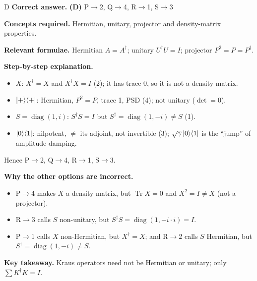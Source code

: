 \documentclass[11pt,a4paper]{article}
\newcommand{\qsep}{\par\vspace{2pt}{\color{black!15}\hrule}\vspace{4pt}}
\begin{document}
\begin{solbox}{D}
\textbf{\color{brand}Correct answer.} \textcolor{okgreen}{\textbf{(D)}} P$\to$2, Q$\to$4, R$\to$1, S$\to$3

\textbf{\color{brand}Concepts required.} Hermitian, unitary, projector and density-matrix properties.

\textbf{\color{brand}Relevant formulae.} Hermitian $A = A^\dagger$; unitary $U^\dagger U = I$; projector $P^2 = P = P^\dagger$.

\textbf{\color{brand}Step-by-step explanation.} \begin{itemize}\itemsep0pt
\item $X$: $X^\dagger = X$ and $X^\dagger X = I$ (2); it has trace 0, so it is not a density matrix.
\item $\ket+\!\bra+$: Hermitian, $P^2 = P$, trace 1, PSD (4); not unitary ($\det = 0$).
\item $S = \operatorname{diag}(1, i)$: $S^\dagger S = I$ but $S^\dagger = \operatorname{diag}(1, -i) \neq S$ (1).
\item $\ket0\!\bra1$: nilpotent, $\neq$ its adjoint, not invertible (3); $\sqrt\gamma\ket0\!\bra1$ is the ``jump'' of amplitude damping.
\end{itemize}
Hence P$\to$2, Q$\to$4, R$\to$1, S$\to$3.

\textbf{\color{brand}Why the other options are incorrect.}
\begin{itemize}[leftmargin=2.4em, itemsep=1pt, topsep=2pt]
\item[\textbf{(A)}] P$\to$4 makes $X$ a density matrix, but $\operatorname{Tr}X = 0$ and $X^2 = I \neq X$ (not a projector).
\item[\textbf{(B)}] R$\to$3 calls $S$ non-unitary, but $S^\dagger S = \operatorname{diag}(1, -i\cdot i) = I$.
\item[\textbf{(C)}] P$\to$1 calls $X$ non-Hermitian, but $X^\dagger = X$; and R$\to$2 calls $S$ Hermitian, but $S^\dagger = \operatorname{diag}(1, -i) \neq S$.
\end{itemize}
\textbf{\color{brand}Key takeaway.} Kraus operators need not be Hermitian or unitary; only $\sum K^\dagger K = I$.
\end{solbox}
\qsep
\end{document}
